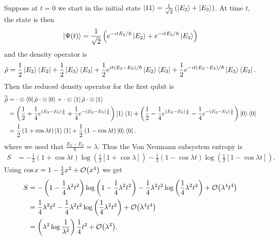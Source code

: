 Suppose at \(t=0\) we start in the initial state \(\left|11\right\rangle = \frac{1}{\sqrt{2}}\left(\left|E_2\right\rangle+\left|E_3\right\rangle\right)\). At time \(t\), the state is then
\[
\left|\Psi(t)\right\rangle = \frac{1}{\sqrt{2}}\left(e^{-itE_2/\hbar}\left|E_2\right\rangle + e^{-itE_3/\hbar} \left|E_3\right\rangle\right)
\]
and the density operator is
\[
\hat{\rho} = \frac{1}{2}\left|E_2\right\rangle\left\langle E_2\right| + \frac{1}{2}\left|E_3\right\rangle\left\langle E_3\right| + \frac{1}{2} e^{it\left(E_3-E_2\right)/\hbar} \left|E_2\right\rangle\left\langle E_3\right| + \frac{1}{2} e^{-it\left(E_3 - E_2\right)/\hbar} \left|E_3\right\rangle\left\langle E_2\right|.
\]
Then the reduced density operator for the first qubit is
\begin{align*}
\overline{\hat{\rho}} &= \cdot\otimes\left\langle0\right| \hat{\rho} \cdot\otimes\left|0\right\rangle + \cdot\otimes\left\langle1\right| \hat{\rho} \cdot\otimes\left|1\right\rangle \\
&= \left(\frac{1}{2} + \frac{1}{4}e^{\left(E_3-E_2\right)\frac{t}{\hbar}} + \frac{1}{4}e^{-\left(E_3-E_2\right)\frac{t}{\hbar}} \right)\left|1\right\rangle\left\langle1\right| + \left(\frac{1}{2} -\frac{1}{4}e^{\left(E_3-E_2\right)\frac{t}{\hbar}} -\frac{1}{4}e^{-\left(E_3-E_2\right)\frac{t}{\hbar}} \right)\left|0\right\rangle\left\langle0\right| \\
&= \frac{1}{2}\left(1 + \cos \lambda t \right)\left|1\right\rangle\left\langle1\right| + \frac{1}{2}\left(1 -\cos \lambda t \right)\left|0\right\rangle\left\langle0\right|.
\end{align*}
where we used that \(\frac{E_3-E_2}{\hbar} = \lambda\). Thus the Von Neumann subsystem entropy is
\begin{align*}
S &= -\frac{1}{2}\left(1 + \cos \lambda t \right)\log \left(\frac{1}{2}\left[1+\cos \lambda\right]\right)
- \frac{1}{2}\left(1 - \cos \lambda t \right)\log \left(\frac{1}{2}\left[1-\cos\lambda t\right]\right).
\end{align*}
Using \(\cos x = 1-\frac{1}{2} x^2 + \mathcal{O}{\left(x^4\right)}\) we get
\begin{align*}
S &=- \left(1-\frac{1}{4}\lambda^2 t^2\right) \log \left(1-\frac{1}{4}\lambda^2 t^2\right) - \frac{1}{4}\lambda^2 t^2 \log \left(\frac{1}{4}\lambda^2 t^2\right) + \mathcal{O}{\left(\lambda^4 t^4\right)}\\
&=\frac{1}{4}\lambda^2 t^2 - \frac{1}{4}\lambda^2 t^2 \log \left(\frac{1}{4}\lambda^2 t^2\right) + \mathcal{O}{\left(\lambda^4 t^4\right)}\\
&= \left(\lambda^2 \log \frac{1}{\lambda^2}\right) \frac{1}{4} t^2 + \mathcal{O}{\left(\lambda^2\right)}.
\end{align*}

